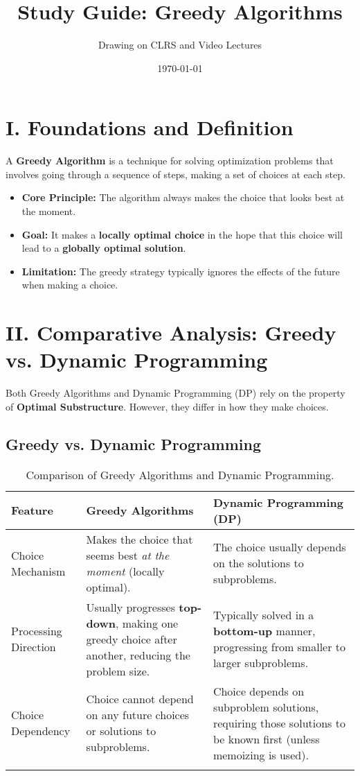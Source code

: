 \documentclass{article}
\title{Study Guide: Greedy Algorithms}
\author{Drawing on CLRS and Video Lectures}
\date{\today}
\begin{document}
\maketitle
\thispagestyle{empty} %

\section{I. Foundations and Definition}

A \textbf{Greedy Algorithm} is a technique for solving optimization problems that involves going through a sequence of steps, making a set of choices at each step.

\begin{itemize}
    \item \textbf{Core Principle:} The algorithm always makes the choice that looks best at the moment.
    \item \textbf{Goal:} It makes a \textbf{locally optimal choice} in the hope that this choice will lead to a \textbf{globally optimal solution}.
    \item \textbf{Limitation:} The greedy strategy typically ignores the effects of the future when making a choice.
\end{itemize}

\section{II. Comparative Analysis: Greedy vs. Dynamic Programming}

Both Greedy Algorithms and Dynamic Programming (DP) rely on the property of \textbf{Optimal Substructure}. However, they differ in how they make choices.

\subsection*{Greedy vs. Dynamic Programming}

\begin{longtable}{|p{}|p{}|p{}|}
\toprule
\textbf{Feature} & \textbf{Greedy Algorithms} & \textbf{Dynamic Programming (DP)} \\
\midrule
Choice Mechanism & Makes the choice that seems best \textit{at the moment} (locally optimal). & The choice usually depends on the solutions to subproblems. \\
\midrule
Processing Direction & Usually progresses \textbf{top-down}, making one greedy choice after another, reducing the problem size. & Typically solved in a \textbf{bottom-up} manner, progressing from smaller to larger subproblems. \\
\midrule
Choice Dependency & Choice cannot depend on any future choices or solutions to subproblems. & Choice depends on subproblem solutions, requiring those solutions to be known first (unless memoizing is used). \\
\bottomrule
\caption{Comparison of Greedy Algorithms and Dynamic Programming.}
\end{longtable}
\end{document}

